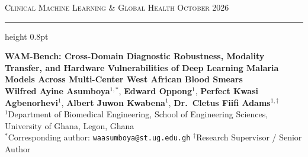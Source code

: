 \documentclass[a4paper,11pt]{article}
\begin{document}
\noindent
{\footnotesize\scshape Clinical Machine Learning \& Global Health \hfill October 2026}
\vspace{3pt}
\hrule height 0.8pt
\vspace{1.8em}

\begin{center}
{\LARGE\bfseries WAM-Bench: Cross-Domain Diagnostic Robustness, Modality Transfer, and Hardware Vulnerabilities of Deep Learning Malaria Models Across Multi-Center West African Blood Smears}\\[1.5em]

{\large \textbf{Wilfred Ayine Asumboya}$^{1,*}$, \textbf{Edward Oppong}$^{1}$, \textbf{Perfect Kwasi Agbenorhevi}$^{1}$, \textbf{Albert Juwon Kwabena}$^{1}$, \textbf{Dr.~Cletus Fiifi Adams}$^{1,\dagger}$}\\[0.45em]
{\small $^{1}$Department of Biomedical Engineering, School of Engineering Sciences, University of Ghana, Legon, Ghana}\\[0.3em]
{\footnotesize $^*$Corresponding author: \texttt{waasumboya@st.ug.edu.gh} \quad $^\dagger$Research Supervisor / Senior Author}\\[1.4em]
\end{center}
\end{document}
